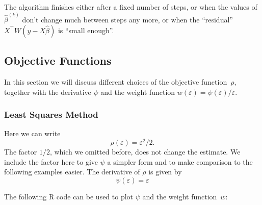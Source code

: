 \documentclass[
  a4paper,
]{article}
\theoremstyle{definition}
\theoremstyle{definition}
\theoremstyle{definition}
\theoremstyle{definition}
\theoremstyle{remark}
\begin{document}
The algorithm finishes either after a fixed number of steps, or when the values
of \(\hat\beta^{(k)}\) don't change much between steps any more, or when the
``residual'' \(X^\top W (y - X\hat\beta)\) is ``small enough''.

\subsection{Objective Functions}\label{objective-functions}

In this section we will discuss different choices of the objective
function~\(\rho\), together with the derivative \(\psi\) and
the weight function \(w(\varepsilon) = \psi(\varepsilon) / \varepsilon\).

\subsubsection{Least Squares Method}\label{least-squares-method}

Here we can write
\begin{equation*}
  \rho(\varepsilon)
  = \varepsilon^2 / 2.
\end{equation*}
The factor \(1/2\), which we omitted before, does not change the estimate. We
include the factor here to give \(\psi\) a simpler form and to make comparison
to the following examples easier. The derivative of \(\rho\) is given by
\begin{equation*}
  \psi(\varepsilon)
  = \varepsilon
\end{equation*}

The following R code can be used to plot \(\psi\) and the weight
function~\(w\):
\end{document}
